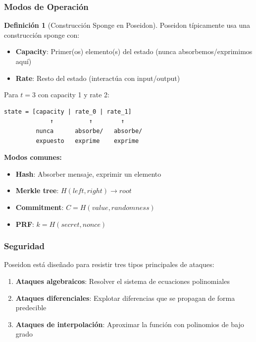 \documentclass[11pt,a4paper,twoside,openright]{book}
\theoremstyle{definition}
\newtheorem{definition}{Definición}[chapter]
\theoremstyle{plain}
\theoremstyle{remark}
\begin{document}
\subsubsection{Modos de Operación}

\begin{definition}[Construcción Sponge en Poseidon]
Poseidon típicamente usa una construcción sponge con:
\begin{itemize}
    \item \textbf{Capacity}: Primer(os) elemento(s) del estado (nunca absorbemos/exprimimos aquí)
    \item \textbf{Rate}: Resto del estado (interactúa con input/output)
\end{itemize}

Para $t = 3$ con capacity 1 y rate 2:
\begin{verbatim}
state = [capacity | rate_0 | rate_1]
             ↑          ↑        ↑
         nunca      absorbe/   absorbe/
         expuesto   exprime    exprime
\end{verbatim}
\end{definition}

\textbf{Modos comunes:}

\begin{itemize}
    \item \textbf{Hash}: Absorber mensaje, exprimir un elemento
    \item \textbf{Merkle tree}: $H(left, right) \to root$
    \item \textbf{Commitment}: $C = H(value, randomness)$
    \item \textbf{PRF}: $k = H(secret, nonce)$
\end{itemize}

\subsubsection{Seguridad}

\begin{keyidea}
Poseidon está diseñado para resistir tres tipos principales de ataques:
\begin{enumerate}
    \item \textbf{Ataques algebraicos}: Resolver el sistema de ecuaciones polinomiales
    \item \textbf{Ataques diferenciales}: Explotar diferencias que se propagan de forma predecible
    \item \textbf{Ataques de interpolación}: Aproximar la función con polinomios de bajo grado
\end{enumerate}
\end{keyidea}
\end{document}
